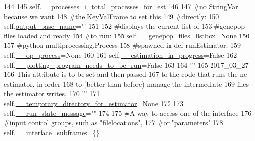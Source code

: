 \begin{DoxyCode}
144 
145         self.\hyperlink{classnegui_1_1pgguineestimator_1_1PGGuiNeEstimator_a80dfa4d2fe2b0195f50076767ae640f5}{\_\_processes}=i\_total\_processes\_for\_est
146 
147         \textcolor{comment}{#no StringVar because we want}
148         \textcolor{comment}{#the KeyValFrame to set this}
149         \textcolor{comment}{#directly:}
150         self.\hyperlink{classnegui_1_1pgguineestimator_1_1PGGuiNeEstimator_a06cd70f99cee79ebf3a4efb9a17880e9}{output\_base\_name}=\textcolor{stringliteral}{""}
151 
152         \textcolor{comment}{#displays the current list of}
153         \textcolor{comment}{#genepop files loaded and ready}
154         \textcolor{comment}{#to run:}
155         self.\hyperlink{classnegui_1_1pgguineestimator_1_1PGGuiNeEstimator_ad4e1cb18633397fe8441110ebe87406f}{\_\_genepop\_files\_listbox}=\textcolor{keywordtype}{None}
156 
157         \textcolor{comment}{#python multiprocessing.Process}
158         \textcolor{comment}{#spawned in def runEstimator:}
159         self.\hyperlink{classnegui_1_1pgguineestimator_1_1PGGuiNeEstimator_afdca00d33f75f1930108ec5c717d3051}{\_\_op\_process}=\textcolor{keywordtype}{None}
160 
161         self.\hyperlink{classnegui_1_1pgguineestimator_1_1PGGuiNeEstimator_ae1de64a603cfff655b0b0a26e97d6078}{\_\_estimation\_in\_progress}=\textcolor{keyword}{False}
162         self.\hyperlink{classnegui_1_1pgguineestimator_1_1PGGuiNeEstimator_add9f89eba5935d4ff5af7ddbe59ecb7f}{\_\_plotting\_program\_needs\_to\_be\_run}=\textcolor{keyword}{False}
163 
164         \textcolor{stringliteral}{'''}
165 \textcolor{stringliteral}{        2017\_03\_27}
166 \textcolor{stringliteral}{        This attribute is to be set and then passed }
167 \textcolor{stringliteral}{        to the code that runs the ne estimator, in order}
168 \textcolor{stringliteral}{        to (better than before) manage the intermediate}
169 \textcolor{stringliteral}{        files the estimator writes.}
170 \textcolor{stringliteral}{        '''}
171         self.\hyperlink{classnegui_1_1pgguineestimator_1_1PGGuiNeEstimator_ac0451bb2cf56f46b6f01c9cf621f267f}{\_\_temporary\_directory\_for\_estimator}=\textcolor{keywordtype}{None}
172 
173         self.\hyperlink{classnegui_1_1pgguineestimator_1_1PGGuiNeEstimator_ae6a16b7c4d38875158d845896d6be3cc}{\_\_run\_state\_message}=\textcolor{stringliteral}{""}
174 
175         \textcolor{comment}{#A way to access one of the interface}
176         \textcolor{comment}{#input control groups, such as "filelocations",}
177         \textcolor{comment}{#or "parameters"}
178         self.\hyperlink{classnegui_1_1pgguineestimator_1_1PGGuiNeEstimator_a0be98605a1f3c311a4c1d499c0539027}{\_\_interface\_subframes}=\{\}

\end{DoxyCode}
